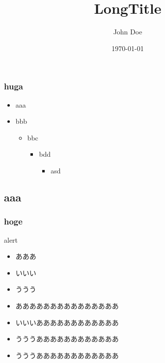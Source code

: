 \documentclass[10pt,dvipdfmx]{beamer}
\title[ShortTitle]{LongTitle}
\author[John]{John Doe}
\institute[SIT]{Shibaura Univ}
\date{\today}
\begin{document}
\begin{frame}
  \titlepage
\end{frame}
\begin{frame}
  \tableofcontents
\end{frame}
\begin{frame}
  \frametitle{huga}
  \begin{itemize}
    \item aaa
    \item bbb
    \begin{itemize}
      \item bbc
      \begin{itemize}
        \item bdd
        \begin{itemize}
          \item asd
        \end{itemize}
      \end{itemize}
    \end{itemize}
  \end{itemize}
\end{frame}
\begin{frame}
  \section{aaa}
  \frametitle{hoge}
  \alert{alert}\\
  \begin{itemize}
    \item あああ
    \item いいい
    \item ううう
  \end{itemize}
  \begin{itemize}
    \item[\Mballitem] あああああああああああああああ
    \item[\Mballitem] いいいああああああああああああ
    \item[\Mballiitem] うううああああああああああああ
    \item[\Mballiiiitem] うううああああああああああああ
  \end{itemize}
\end{frame}
\end{document}
